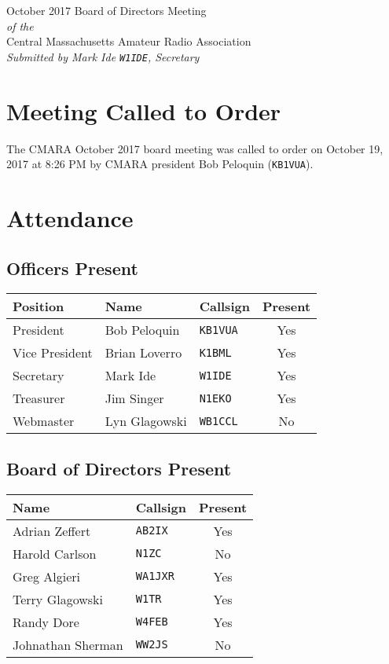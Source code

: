 \documentclass[10pt,letterpaper]{article}
\begin{document}
\begin{center}
{\huge October 2017 Board of Directors Meeting}\\
\emph{of the}\\
{\Large Central Massachusetts Amateur Radio Association}\\
\emph{Submitted by Mark Ide \texttt{W1IDE}, Secretary}
\end{center}

\section{Meeting Called to Order}
The CMARA October 2017 board meeting was called to order on October 19, 2017 at 8:26 PM by CMARA president Bob Peloquin (\texttt{KB1VUA}).

\section{Attendance}

\subsection{Officers Present}
\begin{tabular}{|l|l|l|c|}
  \hline
  \textbf{Position} & \textbf{Name}  & \textbf{Callsign} & \textbf{Present} \\ \hline
  President         & Bob Peloquin   & \texttt{KB1VUA}   & Yes \\
  Vice President    & Brian Loverro  & \texttt{K1BML}    & Yes \\
  Secretary         & Mark Ide       & \texttt{W1IDE}    & Yes \\
  Treasurer         & Jim Singer     & \texttt{N1EKO}    & Yes \\
  Webmaster         & Lyn Glagowski  & \texttt{WB1CCL}   & No \\
  \hline
\end{tabular}

\subsection{Board of Directors Present}
\begin{tabular}{|l|l|c|}
  \hline
  \textbf{Name}     & \textbf{Callsign} & \textbf{Present} \\ \hline
  Adrian Zeffert    & \texttt{AB2IX}    & Yes \\
  Harold Carlson    & \texttt{N1ZC}     & No  \\
  Greg Algieri      & \texttt{WA1JXR}   & Yes \\
  Terry Glagowski   & \texttt{W1TR}     & Yes \\
  Randy Dore        & \texttt{W4FEB}    & Yes \\
  Johnathan Sherman & \texttt{WW2JS}    & No  \\
  \hline
\end{tabular}
\end{document}
